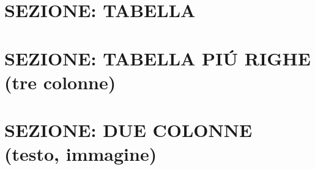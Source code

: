 \documentclass[aspectratio=1610]{beamer}
\begin{document}
\section{SEZIONE: TABELLA}


\section{SEZIONE: TABELLA PI\'U RIGHE (tre colonne)}


\section{SEZIONE: DUE COLONNE (testo, immagine)}
\end{document}
